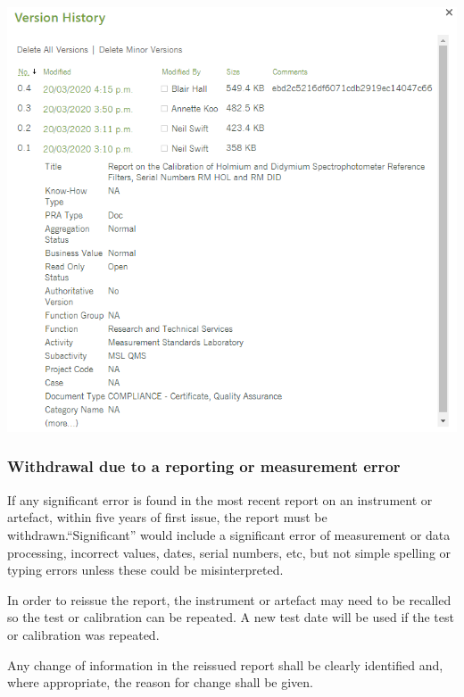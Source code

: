 {\begin{center}
\includegraphics[scale=.6]{pictures/version_history_report}
\end{center}
}
\subsubsection{Withdrawal due to a reporting or measurement error}
\label{sss:reissue_report}
If any significant error is found in the most recent report on an instrument or artefact, within five years of first issue, the report must be withdrawn.``Significant'' would include a significant error of measurement or data processing, incorrect values, dates, serial numbers, etc, but not simple spelling or typing errors unless these could be misinterpreted.

In order to reissue the report, the instrument or artefact may need to be recalled so the test or calibration can be repeated. A new test date will be used if the test or calibration was repeated.

Any change of information in the reissued report shall be clearly identified and, where appropriate, the reason for change shall be given.




